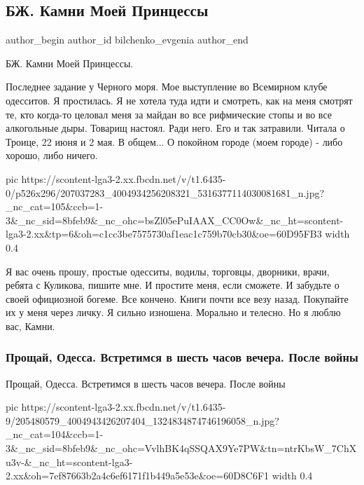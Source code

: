  
 
 
 
 
 
\subsection{БЖ. Камни Моей Принцессы}
\label{sec:24_06_2021.fb.bilchenko_evgenia.3.kamni_mojej_princessy}
\ifcmt
 author_begin
   author_id bilchenko_evgenia
 author_end
\fi

БЖ. Камни Моей Принцессы.

Последнее задание у Черного моря. Мое выступление во Всемирном клубе одесситов.
Я простилась. Я не хотела туда идти и смотреть, как на меня смотрят те, кто
когда-то целовал меня за майдан во все рифмические стопы и во все алкогольные
дыры. Товарищ настоял. Ради него. Его и так затравили. Читала о Троице, 22 июня
и 2 мая. В общем... О покойном городе (моем городе) - либо хорошо, либо ничего. 

\ifcmt
  pic https://scontent-lga3-2.xx.fbcdn.net/v/t1.6435-0/p526x296/207037283_4004934256208321_5316377114030081681_n.jpg?_nc_cat=105&ccb=1-3&_nc_sid=8bfeb9&_nc_ohc=bsZl05ePuIAAX_CC0Ow&_nc_ht=scontent-lga3-2.xx&tp=6&oh=c1cc3be7575730af1eac1c759b70cb30&oe=60D95FB3
	width 0.4
\fi

Я вас очень прошу, простые одесситы, водилы, торговцы, дворники, врачи, ребята
с Куликова, пишите мне. И простите меня, если сможете. И забудьте о своей
официозной богеме. Все кончено. Книги почти все везу назад. Покупайте их у меня
через личку. Я сильно изношена. Морально и телесно. Но я люблю вас, Камни.


\subsubsection{Прощай, Одесса. Встретимся в шесть часов вечера. После войны}

Прощай, Одесса. Встретимся в шесть часов вечера. После войны

\ifcmt
  pic https://scontent-lga3-2.xx.fbcdn.net/v/t1.6435-9/205480579_4004943426207404_1324834874746196058_n.jpg?_nc_cat=104&ccb=1-3&_nc_sid=8bfeb9&_nc_ohc=VvlhBK4qSSQAX9Ye7PW&tn=ntrKbsW_7ChXu3v-&_nc_ht=scontent-lga3-2.xx&oh=7ef87663b2a4c6ef6171f1b449a5e53e&oe=60D8C6F1
	width 0.4
\fi

